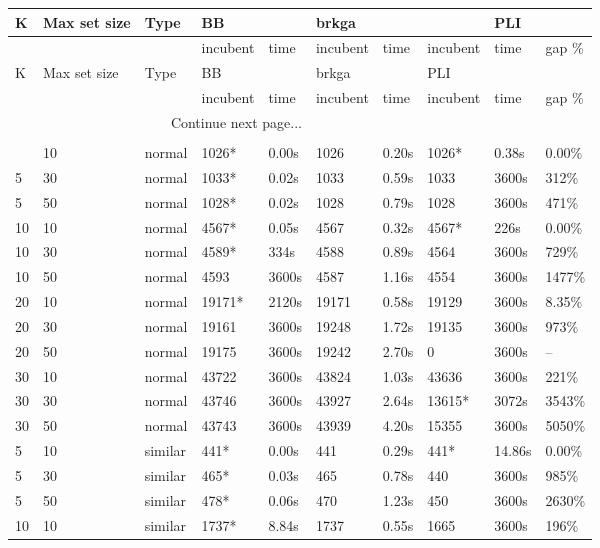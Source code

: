 \begin{scriptsize}
\setlength\LTleft{0pt}            %
\setlength\LTright{0pt}           %
\label{table:tests}
\begin{longtable}{@{\extracolsep{\fill}}l|l|l|ll|ll|lll@{}}
\hline
K & Max set size & Type & BB & & brkga & & & PLI\\ 
\hline
& & & incubent & time & incubent & time & incubent & time & gap \%\\ 
\hline
\endfirsthead
\hline
K & Max set size & Type & BB & & brkga & & PLI\\ 
\hline
& & & incubent & time & incubent & time & incubent & time & gap \%\\ 
\hline
\endhead
\hline \multicolumn{5}{r}{{Continue next page...}} \\ 
\endfoot
\multicolumn{5}{r}{{}} \\ 
\endlastfoot
 5 & 10 & normal& 1026*& 0.00s& 1026& 0.20s & 1026*& 0.38s & 0.00\% \\
 5 & 30 & normal& 1033*& 0.02s& 1033& 0.59s & 1033& 3600s& 312\% \\
 5 & 50 & normal& 1028*& 0.02s& 1028& 0.79s & 1028& 3600s& 471\% \\
 10 & 10 & normal& 4567*& 0.05s& 4567& 0.32s & 4567*& 226s & 0.00\% \\
 10 & 30 & normal& 4589*& 334s & 4588& 0.89s & 4564& 3600s& 729\% \\
 10 & 50 & normal& 4593& 3600s& 4587& 1.16s & 4554& 3600s& 1477\% \\
 20 & 10 & normal& 19171*& 2120s & 19171& 0.58s & 19129& 3600s& 8.35\% \\
 20 & 30 & normal& 19161& 3600s& 19248& 1.72s & 19135& 3600s& 973\% \\
 20 & 50 & normal& 19175& 3600s& 19242& 2.70s & 0& 3600s& -- \\
 30 & 10 & normal& 43722& 3600s& 43824& 1.03s & 43636& 3600s& 221\% \\
 30 & 30 & normal& 43746& 3600s& 43927& 2.64s & 13615*& 3072s & 3543\% \\
 30 & 50 & normal& 43743& 3600s& 43939& 4.20s & 15355& 3600s& 5050\% \\
 5 & 10 & similar& 441*& 0.00s& 441& 0.29s & 441*& 14.86s & 0.00\% \\
 5 & 30 & similar& 465*& 0.03s& 465& 0.78s & 440& 3600s& 985\% \\
 5 & 50 & similar& 478*& 0.06s& 470& 1.23s & 450& 3600s& 2630\% \\
 10 & 10 & similar& 1737*& 8.84s& 1737& 0.55s & 1665& 3600s& 196\% \\

\end{longtable}
\end{scriptsize}
